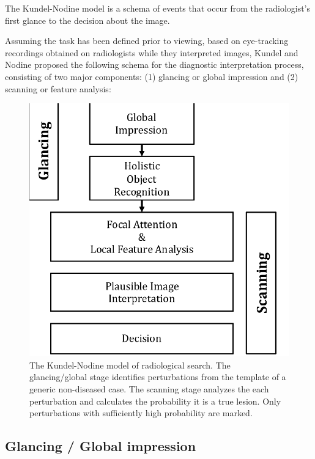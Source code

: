 \documentclass[
]{book}
\begin{document}
The Kundel-Nodine model \citep{kundel2007holistic, kundel2004modeling} is a schema of events that occur from the radiologist's first glance to the decision about the image.

Assuming the task has been defined prior to viewing, based on eye-tracking recordings obtained on radiologists while they interpreted images, Kundel and Nodine proposed the following schema for the diagnostic interpretation process, consisting of two major components: (1) glancing or global impression and (2) scanning or feature analysis:

\begin{figure}

{\centering \includegraphics{images/15-visual-search/kundel-nodine} 

}

\caption{The Kundel-Nodine model of radiological search. The glancing/global stage identifies perturbations from the template of a generic non-diseased case. The scanning stage analyzes the each perturbation and calculates the probability it is a true lesion. Only perturbations with sufficiently high probability are marked.}\label{fig:visual-search-kundel-nodine}
\end{figure}

\hypertarget{visual-search-glancing-global-impression}{%
\subsection{Glancing / Global impression}\label{visual-search-glancing-global-impression}}
\end{document}

